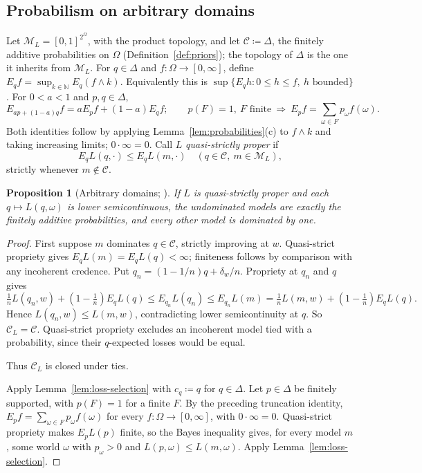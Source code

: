 \documentclass[11pt]{article}
\newtheorem{proposition}[theorem]{Proposition}
\theoremstyle{definition}
\theoremstyle{remark}
\newcommand{\M}{\mathcal M}
\newcommand{\C}{\mathcal C}
\begin{document}
\subsection{Probabilism on arbitrary domains}
Let $\M_L=[0,1]^{2^\Omega}$, with the product topology, and let {$\C\coloneqq\Delta$, the finitely additive probabilities on $\Omega$ (Definition~\ref{def:priors}); the topology of $\Delta$ is the one it inherits from $\M_L$. For $q\in\Delta$ and $f:\Omega\to[0,\infty]$,} define $E_qf=\sup_{k\in\mathbb N}E_q(f\wedge k)$. Equivalently this is $\sup\{E_qh:0\le h\le f,\ h\text{ bounded}\}$. For $0<a<1$ and $p,q\in\Delta$,
\[
E_{ap+(1-a)q}f=aE_pf+(1-a)E_qf;
\qquad p(F)=1,\ F\text{ finite}\ \Longrightarrow\ E_pf=\sum_{\omega\in F}p_\omega f(\omega).
\]
Both identities follow by applying Lemma~\ref{lem:probabilities}(c) to $f\wedge k$ and taking increasing limits; $0\cdot\infty=0$. Call $L$ \emph{quasi-strictly proper} if
\[
E_qL(q,\cdot)\le E_qL(m,\cdot)\quad(q\in\C,\ m\in\M_L),
\]
strictly whenever $m\notin\C$.
\begin{proposition}[Arbitrary domains; {\cite{Nielsen2023}}]\label{prop:short-infinite}
If $L$ is quasi-strictly proper and each $q\mapsto L(q,\omega)$ is lower semicontinuous, the undominated models are exactly the finitely additive probabilities, and every other model is dominated by one.
\end{proposition}
\begin{proof}
First suppose $m$ dominates $q\in\C$, strictly improving at $w$. Quasi-strict propriety gives $E_qL(m)=E_qL(q)<\infty$; finiteness follows by comparison with any incoherent credence. Put $q_n=(1-1/n)q+\delta_w/n$. Propriety at $q_n$ and $q$ gives
\[
\tfrac1nL(q_n,w)+(1-\tfrac1n)E_qL(q)
\le E_{q_n}L(q_n)\le E_{q_n}L(m)
=\tfrac1nL(m,w)+(1-\tfrac1n)E_qL(q).
\]
Hence $L(q_n,w)\le L(m,w)$, contradicting lower semicontinuity at $q$. So $\C_L=\C$. Quasi-strict propriety excludes an incoherent model tied with a probability, since their $q$-expected losses would be equal. {Thus $\C_L$ is closed under ties.

Apply Lemma~\ref{lem:loss-selection} with $c_q\coloneqq q$ for $q\in\Delta$. Let $p\in\Delta$ be finitely supported, with $p(F)=1$ for a finite $F$. By the preceding truncation identity, $E_pf=\sum_{\omega\in F}p_\omega f(\omega)$ for every $f:\Omega\to[0,\infty]$, with $0\cdot\infty=0$. Quasi-strict propriety makes $E_pL(p)$ finite, so the Bayes inequality gives, for every model $m$, some world $\omega$ with $p_\omega>0$ and $L(p,\omega)\le L(m,\omega)$. Apply Lemma~\ref{lem:loss-selection}.}
\end{proof}
\end{document}
